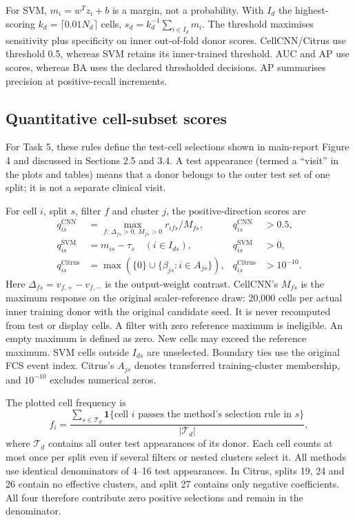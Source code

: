 \documentclass[11pt,a4paper]{article}
\begin{document}
For SVM, $m_i=w^Tz_i+b$ is a margin, not a probability. With $I_d$ the highest-scoring $k_d=\lceil0.01N_d\rceil$ cells, $s_d=k_d^{-1}\sum_{i\in I_d}m_i$. The threshold maximises sensitivity plus specificity on inner out-of-fold donor scores. CellCNN/Citrus use threshold 0.5, whereas SVM retains its inner-trained threshold. AUC and AP use scores, whereas BA uses the declared thresholded decisions. AP summarises precision at positive-recall increments.

\subsection{Quantitative cell-subset scores}
\label{sec:testsubsets}
For Task 5, these rules define the test-cell selections shown in main-report Figure 4 and discussed in Sections 2.5 and 3.4. A test appearance (termed a ``visit'' in the plots and tables) means that a donor belongs to the outer test set of one split; it is not a separate clinical visit.

For cell $i$, split $s$, filter $f$ and cluster $j$, the positive-direction scores are
\[
\begin{aligned}
q^{\mathrm{CNN}}_{is}&=\max_{f:\,\Delta_{fs}>0,\,M_{fs}>0}r_{ifs}/M_{fs}, &q^{\mathrm{CNN}}_{is}&>0.5,\\
q^{\mathrm{SVM}}_{is}&=m_{is}-\tau_s\quad(i\in I_{ds}), &q^{\mathrm{SVM}}_{is}&>0,\\
q^{\mathrm{Citrus}}_{is}&=\max(\{0\}\cup\{\beta_{js}:i\in A_{js}\}), &q^{\mathrm{Citrus}}_{is}&>10^{-10}.
\end{aligned}
\]
Here $\Delta_{fs}=v_{f,+}-v_{f,-}$ is the output-weight contrast. CellCNN's $M_{fs}$ is the maximum response on the original scaler-reference draw: 20,000 cells per actual inner training donor with the original candidate seed. It is never recomputed from test or display cells. A filter with zero reference maximum is ineligible. An empty maximum is defined as zero. New cells may exceed the reference maximum. SVM cells outside $I_{ds}$ are unselected. Boundary ties use the original FCS event index. Citrus's $A_{js}$ denotes transferred training-cluster membership, and $10^{-10}$ excludes numerical zeros.

The plotted cell frequency is
\[
f_i=\frac{\sum_{s\in\mathcal T_d}\mathbf1\{\text{cell }i\text{ passes the method's selection rule in }s\}}
{|\mathcal T_d|},
\]
where $\mathcal T_d$ contains all outer test appearances of its donor. Each cell counts at most once per split even if several filters or nested clusters select it. All methods use identical denominators of 4--16 test appearances. In Citrus, splits 19, 24 and 26 contain no effective clusters, and split 27 contains only negative coefficients. All four therefore contribute zero positive selections and remain in the denominator.
\end{document}

